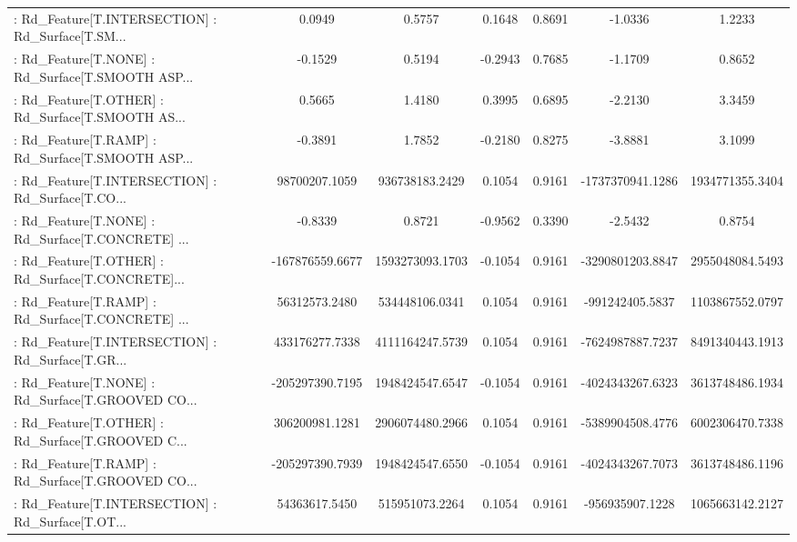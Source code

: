 \begin{longtable}{p{4cm}cccccc}
 : Rd\_Feature[T.INTERSECTION] : Rd\_Surface[T.SM... &            0.0949 &            0.5757 &  0.1648 &       0.8691 &            -1.0336 &            1.2233 \\
 : Rd\_Feature[T.NONE] : Rd\_Surface[T.SMOOTH ASP... &           -0.1529 &            0.5194 & -0.2943 &       0.7685 &            -1.1709 &            0.8652 \\
 : Rd\_Feature[T.OTHER] : Rd\_Surface[T.SMOOTH AS... &            0.5665 &            1.4180 &  0.3995 &       0.6895 &            -2.2130 &            3.3459 \\
 : Rd\_Feature[T.RAMP] : Rd\_Surface[T.SMOOTH ASP... &           -0.3891 &            1.7852 & -0.2180 &       0.8275 &            -3.8881 &            3.1099 \\
 : Rd\_Feature[T.INTERSECTION] : Rd\_Surface[T.CO... &     98700207.1059 &    936738183.2429 &  0.1054 &       0.9161 &   -1737370941.1286 &   1934771355.3404 \\
 : Rd\_Feature[T.NONE] : Rd\_Surface[T.CONCRETE] ... &           -0.8339 &            0.8721 & -0.9562 &       0.3390 &            -2.5432 &            0.8754 \\
 : Rd\_Feature[T.OTHER] : Rd\_Surface[T.CONCRETE]... &   -167876559.6677 &   1593273093.1703 & -0.1054 &       0.9161 &   -3290801203.8847 &   2955048084.5493 \\
 : Rd\_Feature[T.RAMP] : Rd\_Surface[T.CONCRETE] ... &     56312573.2480 &    534448106.0341 &  0.1054 &       0.9161 &    -991242405.5837 &   1103867552.0797 \\
 : Rd\_Feature[T.INTERSECTION] : Rd\_Surface[T.GR... &    433176277.7338 &   4111164247.5739 &  0.1054 &       0.9161 &   -7624987887.7237 &   8491340443.1913 \\
 : Rd\_Feature[T.NONE] : Rd\_Surface[T.GROOVED CO... &   -205297390.7195 &   1948424547.6547 & -0.1054 &       0.9161 &   -4024343267.6323 &   3613748486.1934 \\
 : Rd\_Feature[T.OTHER] : Rd\_Surface[T.GROOVED C... &    306200981.1281 &   2906074480.2966 &  0.1054 &       0.9161 &   -5389904508.4776 &   6002306470.7338 \\
 : Rd\_Feature[T.RAMP] : Rd\_Surface[T.GROOVED CO... &   -205297390.7939 &   1948424547.6550 & -0.1054 &       0.9161 &   -4024343267.7073 &   3613748486.1196 \\
 : Rd\_Feature[T.INTERSECTION] : Rd\_Surface[T.OT... &     54363617.5450 &    515951073.2264 &  0.1054 &       0.9161 &    -956935907.1228 &   1065663142.2127 \\

\end{longtable}
